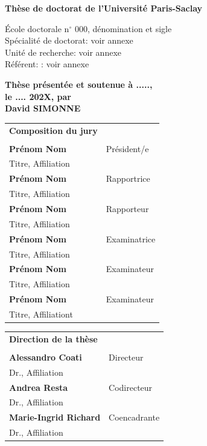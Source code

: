 \documentclass[french,12pt,a4paper]{book}
\begin{document}
\begin{titlepage}
\vspace{1.5cm}
\normalsize

\textbf{Thèse de doctorat de l'Université Paris-Saclay}


\vspace{15mm}

École doctorale n$^{\circ}$ 000, dénomination et sigle\\
\small Spécialité de doctorat: voir annexe\\
\footnotesize Unité de recherche: voir annexe\\
\footnotesize Référent: : voir annexe
\vspace{15mm}

\textbf{Thèse présentée et soutenue à .....,\\ le .... 202X, par}\\
\bigskip
\Large {\color{Prune} \textbf{David SIMONNE}}


\vspace{\fill} %

\bigskip

\flushleft

\scriptsize
\begin{tabular}{|p{7cm}l}
\arrayrulecolor{Prune}
{\footnotesize \textbf{Composition du jury}}\\
& \\
\textbf{Prénom Nom} &   Président/e\\ 
Titre, Affiliation & \\
\textbf{Prénom Nom} &  Rapportrice \\ 
Titre, Affiliation   &   \\ 
\textbf{Prénom Nom} &  Rapporteur \\ 
Titre, Affiliation  &   \\ 
\textbf{Prénom Nom} &  Examinatrice \\ 
Titre, Affiliation   &   \\ 
\textbf{Prénom Nom} &  Examinateur \\ 
Titre, Affiliation   &   \\ 
\textbf{Prénom Nom} &  Examinateur \\ 
Titre, Affiliationt   &   \\ 

\end{tabular} 

\medskip
\begin{tabular}{|p{7cm}l}
\arrayrulecolor{Prune}
{\footnotesize \textbf{Direction de la thèse}}\\
& \\
\textbf{Alessandro Coati} &   Directeur\\
Dr., Affiliation & \\
\textbf{Andrea Resta} &   Codirecteur\\
Dr., Affiliation  &   \\
\textbf{Marie-Ingrid Richard} &   Coencadrante\\
Dr., Affiliation  &   \\



\end{tabular}
\end{titlepage}
\end{document}
